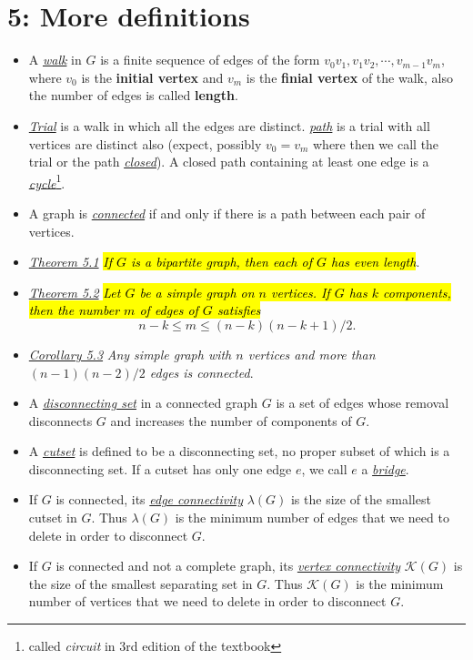 \documentclass[12pt,a4paper, twocolumn]{article}
\begin{document}
\section*{5: More definitions}
\begin{itemize}
		\item A \underline{\emph{\color{magenta} walk}} in $G$ is a finite sequence of edges of the form $v_0 v_1, v_1 v_2, \cdots, v_{m-1} v_m$, where $v_0$ is the \textbf{initial vertex} and $v_m$ is the \textbf{finial vertex} of the walk, also the number of edges is called \textbf{length}.
		\item \underline{\emph{\color{magenta} Trial}} is a walk in which all the edges are distinct. \underline{\emph{\color{magenta} path}} is a trial with all vertices are distinct also (expect, possibly $v_0 = v_m$ where then we call the trial or the path \underline{\emph{\color{magenta} closed}}). A closed path containing at least one edge is a \underline{\emph{\color{magenta} cycle}}\footnote{called \emph{circuit} in 3rd edition of the textbook}.
		\item A graph is \underline{\emph{\color{magenta} connected}} if and only if there is a path between each pair of vertices.
		\item \underline{\emph{\color{magenta} Theorem 5.1}} \hl{\emph{If $G$ is a bipartite graph, then each of $G$ has even length}}.
		\item \underline{\emph{\color{magenta} Theorem 5.2}} \hl{\emph{Let $G$ be a simple graph on $n$ vertices. If $G$ has $k$ components, then the number $m$ of edges of $G$ satisfies}}
				\begin{equation}
						n-k \leq m \leq (n-k)(n-k+1)/2.
				\end{equation}
		\item \underline{\emph{\color{magenta} Corollary 5.3}} \emph{Any simple graph with $n$ vertices and more than $(n-1)(n-2)/2$ edges is connected}.
		\item A \underline{\emph{\color{magenta} disconnecting set}} in a connected graph $G$ is a set of edges whose removal disconnects $G$ and increases the number of components of $G$.
		\item A \underline{\emph{\color{magenta} cutset}} is defined to be a disconnecting set, no proper subset of which is a disconnecting set. If a cutset has only one edge $e$, we call $e$ a \underline{\emph{\color{magenta} bridge}}.
		\item If $G$ is connected, its \underline{\emph{\color{magenta} edge connectivity}} $\lambda (G)$ is the size of the smallest cutset in $G$. Thus $\lambda (G)$ is the minimum number of edges that we need to delete in order to disconnect $G$.
		\item If $G$ is connected and not a complete graph, its \underline{\emph{\color{magenta} vertex connectivity}} $\mathcal{K}(G)$ is the size of the smallest separating set in $G$. Thus $\mathcal{K}(G)$ is the minimum number of vertices that we need to delete in order to disconnect $G$.
\end{itemize}
\end{document}
